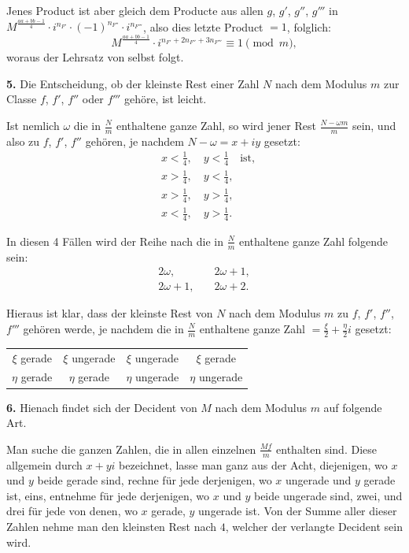 \documentclass[12pt,a4paper]{article}
\begin{document}
Jenes Product ist aber gleich dem Producte aus allen $g$, $g'$, $g''$, $g'''$ in $M^{\frac{aa+bb-1}{4}} \cdot i^{n_{F'}} \cdot (-1)^{n_{F''}} \cdot i^{n_{F'''}}$,
also dies letzte Product $= 1$, folglich:
\[
M^{\frac{aa+bb-1}{4}} \cdot i^{n_{F'} + 2n_{F''} + 3n_{F'''}} \equiv 1 \pmod{m},
\]
woraus der Lehrsatz von selbst folgt.

\textbf{5.} Die Entscheidung, ob der kleinste Rest einer Zahl $N$ nach dem Modulus $m$ zur Classe
$f$, $f'$, $f''$ oder $f'''$ gehöre, ist leicht.

Ist nemlich $\omega$ die in $\frac{N}{m}$ enthaltene ganze Zahl, so wird jener Rest $\frac{N - \omega m}{m}$ sein, und
also zu $f$, $f'$, $f''$ gehören, je nachdem $N - \omega = x + iy$ gesetzt:
\begin{align*}
&x < \tfrac{1}{4}, \quad y < \tfrac{1}{4} \quad \text{ist}, \\
&x > \tfrac{1}{4}, \quad y < \tfrac{1}{4}, \\
&x > \tfrac{1}{4}, \quad y > \tfrac{1}{4}, \\
&x < \tfrac{1}{4}, \quad y > \tfrac{1}{4}.
\end{align*}

In diesen 4 Fällen wird der Reihe nach die in $\frac{N}{m}$ enthaltene ganze Zahl folgende sein:
\begin{align*}
2\omega, &\quad 2\omega + 1, \\
2\omega + 1, &\quad 2\omega + 2.
\end{align*}

Hieraus ist klar, dass der kleinste Rest von $N$ nach dem Modulus $m$ zu $f$, $f'$, $f''$, $f'''$
gehören werde, je nachdem die in $\frac{N}{m}$ enthaltene ganze Zahl $= \frac{\xi}{2} + \frac{\eta}{2}i$ gesetzt:
\begin{center}
\begin{tabular}{c|c|c|c}
$\xi$ gerade & $\xi$ ungerade & $\xi$ ungerade & $\xi$ gerade \\
$\eta$ gerade & $\eta$ gerade & $\eta$ ungerade & $\eta$ ungerade
\end{tabular}
\end{center}


\textbf{6.} Hienach findet sich der Decident von $M$ nach dem Modulus $m$ auf folgende Art.

Man suche die ganzen Zahlen, die in allen einzelnen $\frac{Mf}{m}$ enthalten sind. Diese allgemein
durch $x + yi$ bezeichnet, lasse man ganz aus der Acht, diejenigen, wo $x$ und $y$ beide gerade
sind, rechne für jede derjenigen, wo $x$ ungerade und $y$ gerade ist, eins, entnehme für jede derjenigen,
wo $x$ und $y$ beide ungerade sind, zwei, und drei für jede von denen, wo $x$ gerade, $y$ ungerade
ist. Von der Summe aller dieser Zahlen nehme man den kleinsten Rest nach $4$, welcher der
verlangte Decident sein wird.
\end{document}
